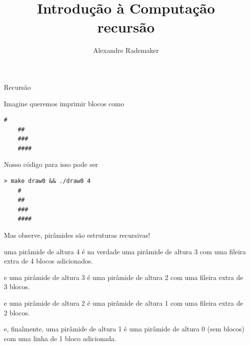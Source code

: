 \documentclass{beamer}
\title{Introdução à Computação \\ recursão}
\author{Alexandre Rademaker}
\date{}
\begin{document}
\begin{frame}
 \maketitle
\end{frame}

\begin{frame}{Recursão}

  Imagine queremos imprimir blocos como

  \vspace{1cm}

  \begin{lstlisting}[basicstyle=\ttfamily]
    #
    ##
    ###
    ####
  \end{lstlisting}

  \framebreak

  Nosso código para isso pode ser

  

  \begin{lstlisting}[basicstyle=\ttfamily\scriptsize]
    > make draw0 && ./draw0 4
    #
    ##
    ###
    ####
  \end{lstlisting}

  \framebreak

  Mas observe, pirâmides são estruturas recursivas!

  uma pirâmide de altura 4 é na verdade uma pirâmide de altura 3 com
  uma fileira extra de 4 blocos adicionados.

  e uma pirâmide de altura 3 é uma pirâmide de altura 2 com uma
  fileira extra de 3 blocos.

  e uma pirâmide de altura 2 é uma pirâmide de altura 1 com uma
  fileira extra de 2 blocos.

  e, finalmente, uma pirâmide de altura 1 é uma pirâmide de altura 0
  (sem blocos) com uma linha de 1 bloco adicionada.

  \framebreak

  

\end{frame}
\end{document}

